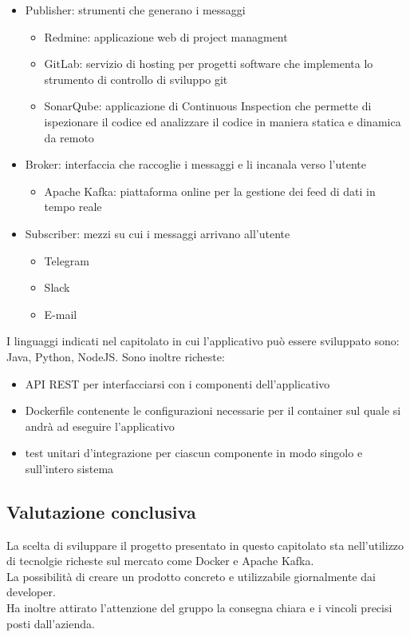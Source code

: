 	\begin{itemize}
		\item Publisher: strumenti che generano i messaggi
		\begin{itemize}
			\item Redmine: applicazione web di project managment
			\item GitLab: servizio di hosting per progetti software che implementa lo strumento di controllo di sviluppo git
			\item SonarQube: applicazione di Continuous Inspection che permette di ispezionare il codice ed analizzare il codice in maniera statica e dinamica da remoto
		\end{itemize}
		\item Broker: interfaccia che raccoglie i messaggi e li incanala verso l'utente
		\begin{itemize}
			\item Apache Kafka: piattaforma online per la gestione dei feed di dati in tempo reale
		\end{itemize}
		\item Subscriber: mezzi su cui i messaggi arrivano all'utente
		\begin{itemize}
			\item Telegram
			\item Slack
			\item E-mail
		\end{itemize}
	\end{itemize}

	I linguaggi indicati nel capitolato in cui l'applicativo può essere sviluppato sono: Java, Python, NodeJS.
	Sono inoltre richeste:
	\begin{itemize}
		\item API REST per interfacciarsi con i componenti dell'applicativo
		\item Dockerfile contenente le configurazioni necessarie per il container sul quale si andrà ad eseguire l'applicativo
		\item test unitari d'integrazione per ciascun componente in modo singolo e sull'intero sistema
	\end{itemize}

    \subsection{Valutazione conclusiva}
	La scelta di sviluppare il progetto presentato in questo capitolato sta nell'utilizzo di tecnolgie richeste sul mercato come Docker e Apache Kafka.\\
	La possibilità di creare un prodotto concreto e utilizzabile giornalmente dai developer.\\
	Ha inoltre attirato l'attenzione del gruppo la consegna chiara e i vincoli precisi posti dall'azienda.